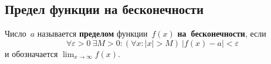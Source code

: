 \subsection{Предел функции на бесконечности}
Число~$a$ называется \textbf{пределом} функции~$f(x)$ \textbf{на~бесконечности}, если
\begin{equation*}
\forall \varepsilon > 0 \ \exists M > 0 \colon (\forall x \colon |x| > M) \ |f(x) - a| < \varepsilon
\end{equation*}
и обозначается $\displaystyle \lim_{x \to \infty} f(x)$.